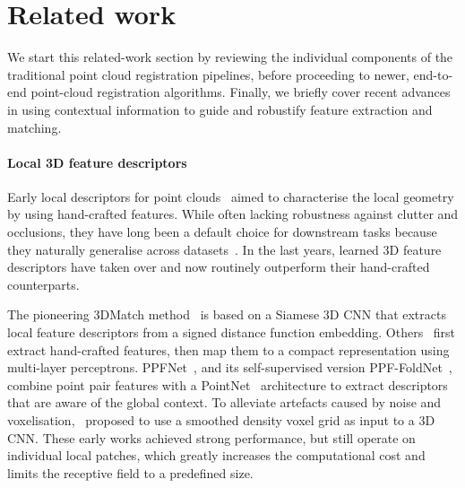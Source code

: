 \section{Related work}
\label{sec:related_work}



We start this related-work section by reviewing the individual components of the traditional point cloud registration pipelines, before proceeding to newer, end-to-end point-cloud registration algorithms. Finally, we briefly cover recent advances in using contextual information to guide and robustify feature extraction and matching.


\paragraph{Local 3D feature descriptors} 
Early local descriptors for point clouds~\cite{johnson1999, rusu2008PFH, rusu2009FPFH, tombari2010SHOT, tombari2010USC} aimed to characterise the local geometry by using hand-crafted features. While often lacking robustness against clutter and occlusions, they have long been a default choice for  downstream tasks because they naturally generalise across datasets~\cite{guo2014performanceEvaluation}. In the last years, learned 3D feature descriptors have taken 
over and now routinely outperform their hand-crafted counterparts.

The pioneering 3DMatch method~\cite{zeng20163dmatch} is based on a Siamese 3D CNN that extracts local feature descriptors from a signed distance function embedding.
Others~\cite{khoury2017CGF, gojcic2018learned} first extract hand-crafted features, then map them to a compact representation using multi-layer perceptrons. PPFNet~\cite{deng2018ppfnet}, and its self-supervised version PPF-FoldNet~\cite{Deng2018PPFFoldNetUL}, combine point pair features with a PointNet~\cite{qi2017pointnet} architecture to extract descriptors that are aware of the global context. To alleviate artefacts caused by noise and voxelisation,~\cite{gojcic20193DSmoothNet} proposed to use a smoothed density voxel grid as input to a 3D CNN. These early works achieved strong performance, but still operate on individual local patches, which greatly increases the computational cost and limits the receptive field to a predefined size.

